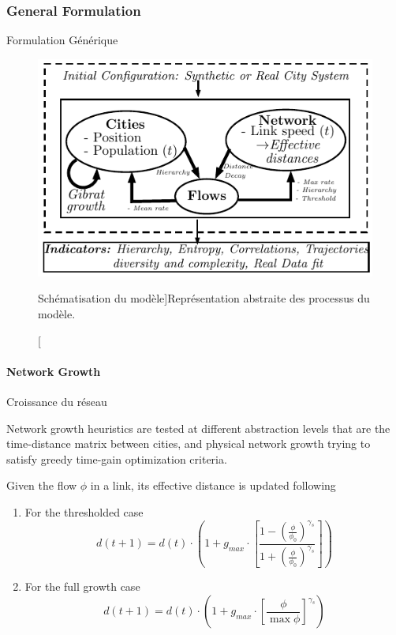 \subsubsection{General Formulation}{Formulation Générique}




\begin{figure}
\includegraphics[width=\linewidth]{Figures/MacroCoEvolModel/model}
\caption[][Schématisation du modèle]{}{Représentation abstraite des processus du modèle.\label{fig:macrocoevolmodel:model}}
\end{figure}








\paragraph{Network Growth}{Croissance du réseau}


Network growth heuristics are tested at different abstraction levels that are the time-distance matrix between cities, and physical network growth trying to satisfy greedy time-gain optimization criteria.

Given the flow $\phi$ in a link, its effective distance is updated following

\begin{enumerate}
\item For the thresholded case
\[
d(t+1) = d(t)\cdot \left( 1 + g_{max} \cdot \left[\frac{1 - \left(\frac{\phi}{\phi_0}\right)^{\gamma_s}}{1 + \left(\frac{\phi}{\phi_0}\right)^{\gamma_s}}\right]\right)
\]
\item For the full growth case
\[
d(t+1) = d(t)\cdot \left(1 + g_{max} \cdot \left[\frac{\phi}{\max \phi}\right]^{\gamma_s}\right)
\]
\end{enumerate}

